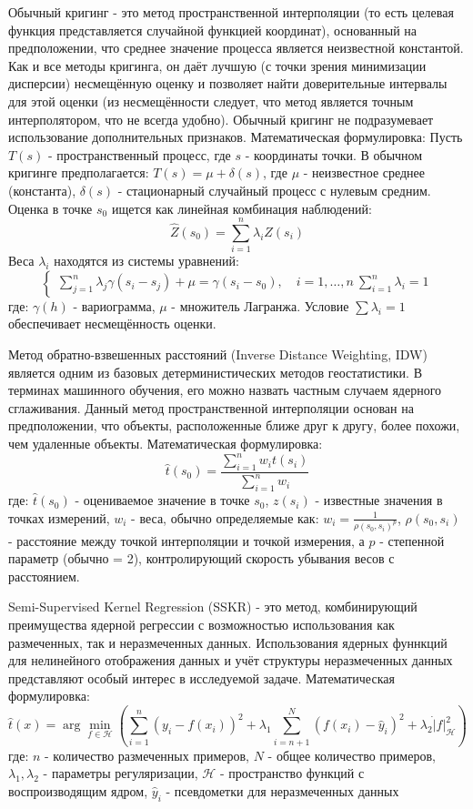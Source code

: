 \documentclass{article}
\begin{document}
Обычный кригинг  - это метод пространственной интерполяции (то есть целевая функция представляется случайной функцией координат), основанный на предположении, что среднее значение процесса является неизвестной константой. Как и все методы кригинга, он даёт лучшую (с точки зрения минимизации дисперсии) несмещённую оценку и позволяет найти доверительные интервалы для этой оценки (из несмещённости следует, что метод является точным интерполятором, что не всегда удобно). Обычный кригинг не подразумевает использование дополнительных признаков.
Математическая формулировка: Пусть $T(s)$ - пространственный процесс, где $s$ - координаты точки. В обычном кригинге предполагается: $T(s) = \mu + \delta(s)$, где $\mu$ - неизвестное среднее (константа), $\delta(s)$ - стационарный случайный процесс с нулевым средним. Оценка в точке $s_0$ ищется как линейная комбинация наблюдений:
$$\hat{Z}(s_0) = \sum_{i=1}^n \lambda_i Z(s_i)$$
Веса $\lambda_i$ находятся из системы уравнений:
$$\begin{cases}
\sum\limits_{j=1}^n \lambda_j \gamma(s_i - s_j) + \mu = \gamma(s_i - s_0), \quad i = 1,\ldots,n \
\sum\limits_{i=1}^n \lambda_i = 1
\end{cases}$$
где: $\gamma(h)$ - вариограмма, $\mu$ - множитель Лагранжа. Условие $\sum \lambda_i = 1$ обеспечивает несмещённость оценки.

Метод обратно-взвешенных расстояний (Inverse Distance Weighting, IDW) является одним из базовых детерминистических методов геостатистики. В терминах машинного обучения, его можно назвать частным случаем ядерного сглаживания. Данный метод пространственной интерполяции основан на предположении, что объекты, расположенные ближе друг к другу, более похожи, чем удаленные объекты.
Математическая формулировка:
$$\hat{t}(s_0) = \frac{\sum_{i=1}^n w_i t(s_i)}{\sum_{i=1}^n w_i}$$
где: $\hat{t}(s_0)$ - оцениваемое значение в точке $s_0$, $z(s_i)$ - известные значения в точках измерений, $w_i$ - веса, обычно определяемые как: $w_i = \frac{1}{\rho(s_0, s_i)^p}$, $\rho(s_0, s_i)$ - расстояние между точкой интерполяции и точкой измерения, а $p$ - степенной параметр (обычно = 2), контролирующий скорость убывания весов с расстоянием. 

Semi-Supervised Kernel Regression (SSKR) - это метод, комбинирующий преимущества ядерной регрессии с возможностью использования как размеченных, так и неразмеченных данных. Использования ядерных фуннкций для нелинейного отображения данных и учёт структуры неразмеченных данных представляют особый интерес в исследуемой задаче.
Математическая формулировка:
$$\hat{t}(x) = \arg\min_{f \in \mathcal{H}} \left( \sum_{i=1}^n (y_i - f(x_i))^2 + \lambda_1 \sum_{i=n+1}^{N} (f(x_i) - \hat{y}_i)^2 + \lambda_2 \dot |f|^2_{\mathcal{H}} \right)$$
где: $n$ - количество размеченных примеров, $N$ - общее количество примеров, $\lambda_1, \lambda_2$ - параметры регуляризации, $\mathcal{H}$ - пространство функций с воспроизводящим ядром,
$\hat{y}_i$ - псевдометки для неразмеченных данных
\end{document}
